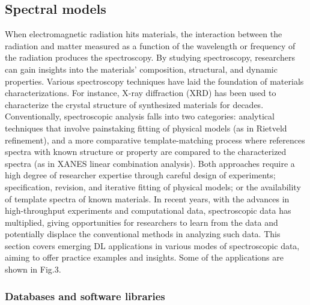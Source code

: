 \documentclass[pdflatex,sn-mathphys]{sn-jnl}%
\theoremstyle{thmstyleone}%
\theoremstyle{thmstyletwo}%
\theoremstyle{thmstylethree}%
\begin{document}


\subsection{Spectral models}\label{sec:spectral}

When electromagnetic radiation hits materials, the interaction between the radiation and matter measured as a function of the wavelength or frequency of the radiation produces the spectroscopy. By studying spectroscopy, researchers can gain insights into the materials’ composition, structural, and dynamic properties. Various spectroscopy techniques have laid the foundation of materials characterizations. For instance, X-ray diffraction (XRD) has been used to characterize the crystal structure of synthesized materials for decades.
Conventionally, spectroscopic analysis falls into two categories: analytical techniques that involve painstaking fitting of physical models (as in Rietveld refinement), and a more comparative template-matching process where references spectra with known structure or property are compared to the characterized spectra (as in XANES linear combination analysis). Both approaches require a high degree of researcher expertise through careful design of experiments; specification, revision, and iterative fitting of physical models; or the availability of template spectra of known materials. In recent years, with the advances in high-throughput experiments and computational data, spectroscopic data has multiplied, giving opportunities for researchers to learn from the data and potentially displace the conventional methods in analyzing such data. This section covers emerging DL applications in various modes of spectroscopic data, aiming to offer practice examples and insights. Some of the applications are shown in Fig.3.


\subsubsection{Databases and software libraries}
\end{document}
